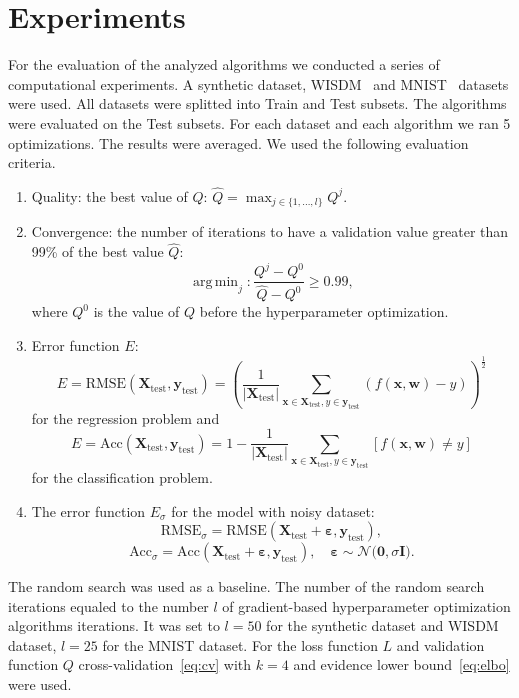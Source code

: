 \documentclass[smallcondensed]{svjour3}
\DeclareMathOperator*{\argmin}{arg\,min}
\begin{document}
\section{Experiments}
\label{experiments}
For the evaluation of the analyzed algorithms we conducted a series of computational experiments. A synthetic dataset, WISDM~\cite{wisdm} and MNIST~\cite{mnist} datasets were used. All datasets were splitted into Train and Test subsets. The  algorithms were evaluated on the Test subsets. For each dataset and each algorithm we ran 5 optimizations. The results were averaged. 
We used the following evaluation criteria.
\begin{enumerate}
\item Quality: the best value of $Q$:  $\hat{Q} = \max_{j \in \{1, \dots, l\}}Q^j$.
\item Convergence: the number of iterations to have a validation value greater than 99\% of the best value $\hat{Q}$:
\[
    \argmin_{j}: \frac{Q^j - Q^0}{\hat{Q} - Q^0} \geq 0.99,
\]
where $Q^0$ is the value of $Q$ before the hyperparameter optimization. 


\item Error function $E$:\[
    E = \text{RMSE}(\mathbf{X}_\text{test}, \mathbf{y}_\text{test}) = \left (\frac{1}{|\mathbf{X}_\text{test}|}\sum_{\mathbf{x} \in\mathbf{X}_\text{test}, y \in \mathbf{y}_\text{test}}  (f(\mathbf{x}, \mathbf{w})-y)\right)^{\frac{1}{2}}
\]
for the regression problem and
\[
    E = \text{Acc}(\mathbf{X}_\text{test}, \mathbf{y}_\text{test}) = 1 - \frac{1}{|\mathbf{X}_\text{test}|}\sum_{\mathbf{x} \in\mathbf{X}_\text{test}, y \in \mathbf{y}_\text{test}} [f(\mathbf{x}, \mathbf{w}) \neq y]
\]
for the classification problem.


\item The error function  $E_\sigma$ for the model with noisy dataset:
\[
    \text{RMSE}_\sigma =  \text{RMSE}(\mathbf{X}_\text{test} +  \boldsymbol{\varepsilon}, \mathbf{y}_\text{test}),\]\[\text{Acc}_\sigma =  \text{Acc}(\mathbf{X}_\text{test} +  \boldsymbol{\varepsilon}, \mathbf{y}_\text{test}),  \quad \boldsymbol{\varepsilon} \sim \mathcal{N}\bigl(\mathbf{0}, \sigma\mathbf{I}\bigr).
\]
\end{enumerate}



The random search was used as a baseline. The number of the random search iterations equaled to the number $l$ of gradient-based hyperparameter optimization algorithms iterations. It was set to $l=50$ for the synthetic dataset and WISDM dataset, $l=25$ for the MNIST dataset.  For the loss  function $L$ and validation function $Q$ cross-validation~\eqref{eq:cv} with $k=4$ and evidence lower bound~\eqref{eq:elbo} were used. 
\end{document}
